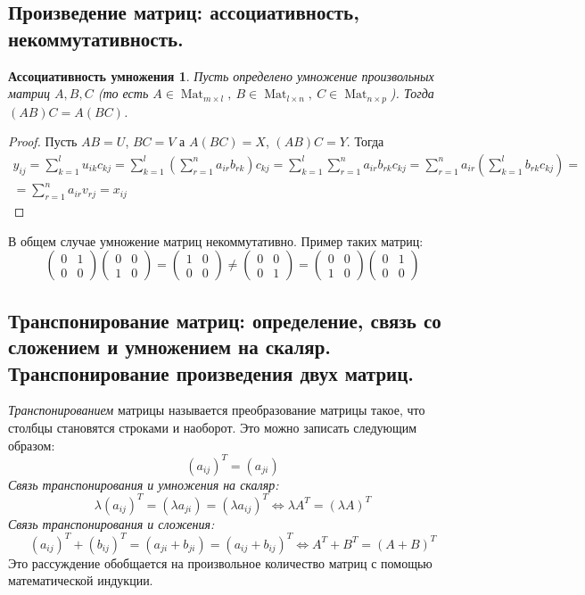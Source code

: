 \documentclass[a4paper, 12pt]{article}
\DeclareMathOperator{\Mat}{Mat}
\newtheorem*{associativity}{Ассоциативность умножения}
\begin{document}
\subsection{Произведение матриц: ассоциативность, некоммутативность.}
\begin{associativity}
Пусть определено умножение произвольных матриц $A, B, C$ (то есть $A \in \Mat_{m\times l}, \ B\in \Mat_{l\times n},\ C \in \Mat_{n\times p}$). Тогда $(AB)C = A(BC)$.
\end{associativity}
\begin{proof} Пусть $AB = U$, $BC = V$ а $A(BC) = X$, $(AB)C = Y$. Тогда 
\begin{multline*}
y_{ij} = \sum_{k = 1}^{l} u_{ik}c_{kj} = \sum_{k = 1}^{l} \left(\sum_{r = 1}^{n} a_{ir} b_{rk}\right) c_{kj} = \sum_{k = 1}^{l} \sum_{r = 1}^{n} a_{ir} b_{rk} c_{kj} = \sum^n_{r=1} a_{ir} \left( \sum^l_{k=1} b_{rk} c_{kj} \right) = \\
= \sum^n_{r = 1} a_{ir} v_{rj} = x_{ij}
\end{multline*}
\end{proof}

В общем случае умножение матриц некоммутативно. Пример таких матриц:
\[\begin{pmatrix} 
0 & 1\\
0 & 0
\end{pmatrix}
\begin{pmatrix}
0 & 0 \\ 
1 & 0
\end{pmatrix} = 
\begin{pmatrix}
1 & 0\\
0 & 0
\end{pmatrix}
\neq
\begin{pmatrix}
0 & 0\\
0 & 1
\end{pmatrix} = 
\begin{pmatrix}
0 & 0 \\ 
1 & 0
\end{pmatrix}
\begin{pmatrix} 
0 & 1\\
0 & 0
\end{pmatrix}\]

\subsection{Транспонирование матриц: определение, связь со сложением и умножением на скаляр. Транспонирование произведения двух матриц.}
\textit{Транспонированием} матрицы называется преобразование матрицы такое, что столбцы становятся строками и наоборот. Это можно записать следующим образом: 
\[(a_{ij})^T = (a_{ji})\]
\textit{Связь транспонирования и умножения на скаляр:}
\[\lambda(a_{ij})^T = (\lambda a_{ji}) = (\lambda a_{ij})^T \Longleftrightarrow \lambda A^T = (\lambda A)^T\]
\textit{Связь транспонирования и сложения:}
\[(a_{ij})^T + (b_{ij})^T = (a_{ji} + b_{ji}) = (a_{ij} + b_{ij})^T \Longleftrightarrow A^T + B^T = (A + B)^T\]
Это рассуждение обобщается на произвольное количество матриц с помощью математической индукции.
\end{document}
